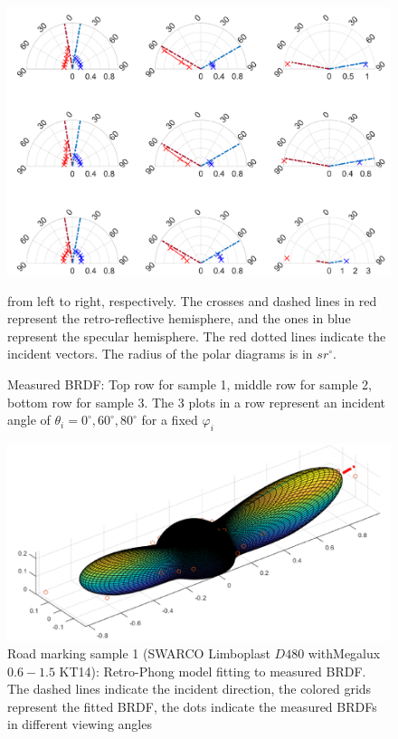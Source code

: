 \begin{figure}[!tb]
    \includegraphics[width=0.9\linewidth]{./figures/measurement-literature/measured-3-road-markings.png}
    \caption{Measured BRDF: Top row for sample 1, middle row for sample 2, bottom row for sample 3.
        The 3 plots in a row represent an incident angle of $\theta_i = 0^\circ, 60^\circ, 80^\circ$ for a fixed $\varphi_i$} from left to right, respectively.
    The crosses and dashed lines in red represent the retro-reflective hemisphere, and the ones in blue represent the specular hemisphere.
    The red dotted lines indicate the incident vectors.
    The radius of the polar diagrams is in $sr^\circ$.
    \label{fig:measured-3-road-markings}
\end{figure}

\begin{figure}[!tb]
    \centering
    \includegraphics[width=0.9\linewidth]{./figures/measurement-literature/retro-phong-fitting-road-marking-1.png}
    \caption{Road marking sample 1 (SWARCO Limboplast $D480$ withMegalux $0.6-1.5$ KT14): Retro-Phong model fitting to measured BRDF.
        The dashed lines indicate the incident direction, the colored grids represent the fitted BRDF, the dots indicate the measured BRDFs in different viewing angles}
    \label{fig:retor-phong-fitting-road-marking}
\end{figure}

